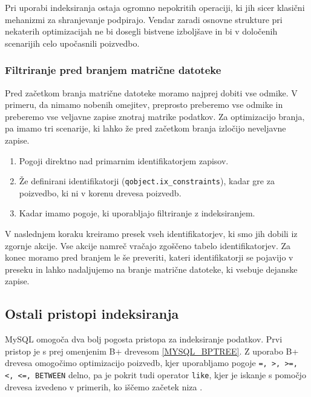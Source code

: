 \documentclass[a4paper,12pt,openright]{book}
\begin{document}
        \noindent
        Pri uporabi indeksiranja ostaja ogromno nepokritih operaciji, ki jih sicer klasični mehanizmi za shranjevanje podpirajo. Vendar zaradi osnovne strukture pri nekaterih optimizacijah ne bi dosegli bistvene izboljšave in bi v določenih scenarijih celo upočasnili poizvedbo.

        \subsubsection{Filtriranje pred branjem matrične datoteke}

        Pred začetkom branja matrične datoteke moramo najprej dobiti vse odmike. V primeru, da nimamo nobenih omejitev, preprosto preberemo vse odmike in preberemo vse veljavne zapise znotraj matrike podatkov. Za optimizacijo branja, pa imamo tri scenarije, ki lahko že pred začetkom branja izločijo neveljavne zapise.

        \begin{enumerate}
            \item Pogoji direktno nad primarnim identifikatorjem zapisov.
            \item Že definirani identifikatorji ({\tt qobject.ix\_constraints}), kadar gre za poizvedbo, ki ni v korenu drevesa poizvedb.
            \item Kadar imamo pogoje, ki uporabljajo filtriranje z indeksiranjem.
        \end{enumerate}

        \noindent
        V naslednjem koraku kreiramo presek vseh identifikatorjev, ki smo jih dobili iz zgornje akcije. Vse akcije namreč vračajo zgoščeno tabelo identifikatorjev. Za konec moramo pred branjem le še preveriti, kateri identifikatorji se pojavijo v preseku in lahko nadaljujemo na branje matrične datoteke, ki vsebuje dejanske zapise.


        \subsection{Ostali pristopi indeksiranja}

        MySQL omogoča dva bolj pogosta pristopa za indeksiranje podatkov. Prvi pristop je s prej omenjenim B+ drevesom \ref{MYSQL_BPTREE}. Z uporabo B+ drevesa omogočimo optimizacijo poizvedb, kjer uporabljamo pogoje {\tt =, >, >=, <, <=, BETWEEN} delno, pa je pokrit tudi operator {\tt like}, kjer je iskanje s pomočjo drevesa izvedeno v primerih, ko iščemo začetek niza \cite{TREE_HASH_MYSQL}.
\end{document}
